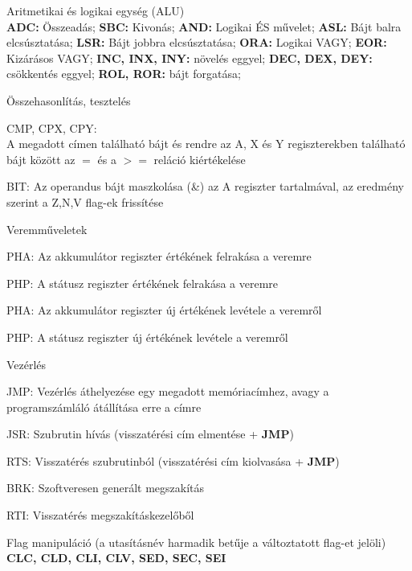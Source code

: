 \begin{compactdesc}
	\item Aritmetikai és logikai egység (ALU) \hfill \\
	\textbf{ADC:} Összeadás;
	\textbf{SBC:} Kivonás;
	\textbf{AND:} Logikai ÉS művelet;
	\textbf{ASL:} Bájt balra elcsúsztatása;
	\textbf{LSR:} Bájt jobbra elcsúsztatása;
	\textbf{ORA:} Logikai VAGY;
	\textbf{EOR:} Kizárásos VAGY;
	\textbf{INC, INX, INY:} növelés eggyel;
	\textbf{DEC, DEX, DEY:} csökkentés eggyel;
	\textbf{ROL, ROR:} bájt forgatása;
	\item 
	Összehasonlítás, tesztelés
	\begin{compactdesc}
		\item[CMP, CPX, CPY:]  \hfill \\ A megadott címen található bájt és rendre az A, X és Y regiszterekben található bájt között az $=$ és a $>=$ reláció kiértékelése
		\item[BIT:] Az operandus bájt maszkolása (\&) az A regiszter tartalmával, az eredmény szerint a Z,N,V flag-ek frissítése 
	\end{compactdesc}
	\item Veremműveletek
	\begin{compactdesc}
		\item[PHA:] Az akkumulátor regiszter értékének felrakása a veremre 
		\item[PHP:] A státusz regiszter értékének felrakása a veremre
		\item[PHA:] Az akkumulátor regiszter új értékének levétele a veremről
		\item[PHP:] A státusz regiszter új értékének levétele a veremről
	\end{compactdesc}
	\item Vezérlés
	\begin{compactdesc}
		\item[JMP:] Vezérlés áthelyezése egy megadott memóriacímhez, avagy a programszámláló átállítása erre a címre
		\item[JSR:] Szubrutin hívás (visszatérési cím elmentése + \textbf{JMP})
		\item[RTS:] Visszatérés szubrutinból (visszatérési cím kiolvasása + \textbf{JMP})
		\item[BRK:] Szoftveresen generált megszakítás
		\item[RTI:] Visszatérés megszakításkezelőből
	\end{compactdesc}
	\item Flag manipuláció (a utasításnév harmadik betűje a változtatott flag-et jelöli) \newline \textbf{CLC, CLD, CLI, CLV, SED, SEC, SEI}

\end{compactdesc}
